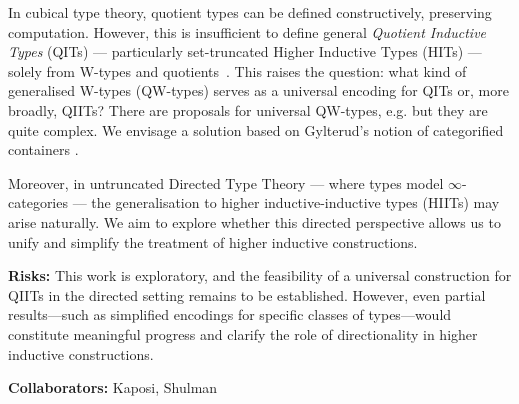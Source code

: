\documentclass[a4paper,11pt]{article}
\renewcommand{\paragraph}[1]{\textbf{#1.}}
\begin{document}
In cubical type theory, quotient types can be defined constructively,
preserving computation. However, this is insufficient to define
general \emph{Quotient Inductive Types} (QITs) — particularly
set-truncated Higher Inductive Types (HITs) — solely from W-types and
quotients~\cite{lumsdaine2020semantics}. This raises the question: what
kind of generalised W-types (QW-types) serves as a universal encoding
for QITs or, more broadly, QIITs? There are proposals for
universal QW-types,
e.g. \cite{fiore2022quotients,kaposi2019constructing} but they are
quite complex. We envisage a solution based on Gylterud's notion of
categorified containers \cite{gylterud2011symmetric,altenkirch2024qits}. 



Moreover, in untruncated Directed Type Theory — where types model
$\infty$-categories — the generalisation to higher inductive-inductive
types (HIITs) may arise naturally. We aim to explore whether this
directed perspective allows us to unify and simplify the treatment of
higher inductive constructions.

\textbf{Risks:} This work is exploratory, and the feasibility of a
universal construction for QIITs in the directed setting remains to be
established. However, even partial results—such as simplified
encodings for specific classes of types—would constitute meaningful
progress and clarify the role of directionality in higher inductive
constructions.

\textbf{Collaborators:} Kaposi, Shulman

\end{document}

